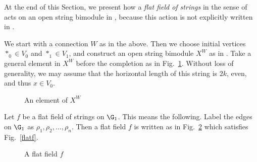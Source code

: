 \documentclass[12pt]{article}
\begin{document}
At the end of this Section, we present how a {\em flat field of strings}
in the sense of \cite[page 563]{EK1} acts on an open string
bimodule in \cite[Claim 1 on page 19]{AH}, because this action
is not explicitly written in \cite{AH}.

We start with a connection $W$ as in the above. Then we choose
initial vertices $*_0\in V_0$ and $*_1\in V_1$, and construct
an open string bimodule $X^W$ as in \cite[page 14]{AH}.
Take a general element in $X^W$ before the completion as in
Fig.~\ref{openstring}.  Without loss of generality, we may
assume that the horizontal length of this string is $2k$, even, 
and thus $x\in V_0$.

\begin{figure}[H]
\begin{center}
\caption{An element of $X^W$}
\label{openstring}
\end{center}
\end{figure}

Let $f$ be a flat field of strings on $\G_1$.  This means
the following. Label the
edges on $\G_1$ as $\rho_1,\rho_2,\dots,\rho_n$.
Then a flat field $f$ is written as in Fig.~\ref{field}
which satisfies Fig.~\ref{flatf}.

\begin{figure}[H]
\begin{center}
\caption{A flat field $f$}
\label{field}
\end{center}
\end{figure}
\end{document}
